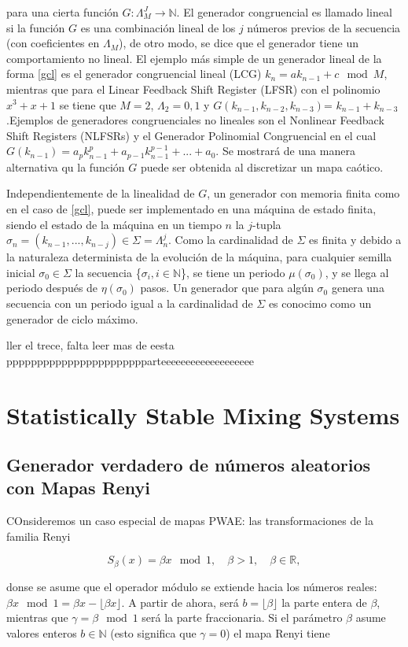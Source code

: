 para una cierta función $G: \Lambda _{M}^{J} \longrightarrow \mathbb{N}$. El generador congruencial es llamado lineal si la función $G$ es una combinación lineal de los $j$ números previos de la secuencia (con coeficientes en $\Lambda_{M}$), de otro modo, se dice que el generador tiene un comportamiento no lineal. El ejemplo más simple de un generador lineal de la forma \eqref{gcl} es el generador congruencial lineal (LCG) $k_{n}= ak_{n-1}+c \mod{M}$, mientras que para el Linear Feedback Shift Register (LFSR) con el polinomio $x^{3}+x+1$ se tiene que $M=2$, $\Lambda_{2}={0,1}$ y $G(k_{n-1}, k_{n-2}, k_{n-3})$= $k_{n-1}+ k_{n-3}$.Ejemplos de generadores congruenciales no lineales son el Nonlinear Feedback Shift Registers (NLFSRs) y el Generador Polinomial Congruencial en el cual $G(k_{n-1})= a_{p}k^{p}_{n-1}+ a_{p-1}k^{p-1}_{n-1}+...+a_{0}$. Se mostrará de una manera alternativa qu la función $G$ puede ser obtenida al discretizar un mapa caótico.

Independientemente de la linealidad de $G$, un generador con memoria finita como en el caso de \eqref{gcl}, puede ser implementado en una máquina de estado finita, siendo el estado de la máquina en un tiempo $n$ la $j$-tupla $\sigma_{n}= (k_{n-1},...,k_{n-j}) \in \Sigma = \Lambda_{n}^{j}$. Como la cardinalidad de $\Sigma$ es finita y debido a la naturaleza determinista de la evolución de la máquina, para cualquier semilla inicial $\sigma_{0} \in \Sigma$  la secuencia \{$\sigma_{i}, i \in \mathbb{N}$\}, se tiene un periodo $\mu(\sigma_{0})$, y se llega al periodo después de $\eta(\sigma_{0})$ pasos. Un generador que para algún $\sigma_{0}$ genera una secuencia con un periodo igual a la cardinalidad de $\Sigma$ es conocimo como un generador de ciclo máximo.



ller el  trece, falta leer mas de eesta ppppppppppppppppppppppparteeeeeeeeeeeeeeeeeee
\section{Statistically Stable Mixing Systems}
\subsection{Generador verdadero de números aleatorios con Mapas Renyi}

COnsideremos un caso especial de mapas PWAE: las transformaciones de la familia Renyi

\begin{equation}
S_{\beta}(x)= \beta x \mod{1}, \quad \beta > 1, \quad \beta \in \mathbb{R},
\end{equation} 

donse se asume que el operador módulo se extiende hacia los números reales: $ \beta x \mod{1} =    \beta x   - \lfloor\beta x  \rfloor $. A partir de ahora, será $b= \lfloor \beta \rfloor$ la parte entera de $\beta$, mientras que $ \gamma = \beta \mod{1} $ será la parte fraccionaria. Si el parámetro $\beta$ asume valores enteros $b \in \mathbb{N}$ (esto significa que $\gamma =0 $) el mapa Renyi tiene 